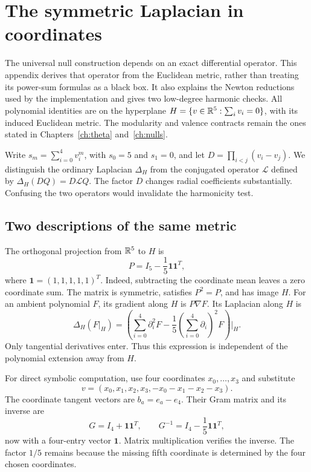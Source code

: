 \chapter{The symmetric Laplacian in coordinates}\label{app:operator}

The universal null construction depends on an exact differential operator. This appendix derives that operator from the Euclidean metric, rather than treating its power-sum formulas as a black box. It also explains the Newton reductions used by the implementation and gives two low-degree harmonic checks. All polynomial identities are on the hyperplane $H=\{v\in\mathbb R^5:\sum_i v_i=0\}$, with its induced Euclidean metric. The modularity and valence contracts remain the ones stated in Chapters~\ref{ch:theta} and~\ref{ch:nulls}.

Write $s_m=\sum_{i=0}^4v_i^m$, with $s_0=5$ and $s_1=0$, and let $D=\prod_{i<j}(v_i-v_j)$. We distinguish the ordinary Laplacian $\Delta_H$ from the conjugated operator $\mathcal L$ defined by $\Delta_H(DQ)=D\mathcal LQ$. The factor $D$ changes radial coefficients substantially. Confusing the two operators would invalidate the harmonicity test.

\section{Two descriptions of the same metric}
The orthogonal projection from $\mathbb R^5$ to $H$ is
\begin{equation}\label{appop:projection}
P=I_5-\frac15\mathbf1\mathbf1^T,
\end{equation}
where $\mathbf1=(1,1,1,1,1)^T$. Indeed, subtracting the coordinate mean leaves a zero coordinate sum. The matrix is symmetric, satisfies $P^2=P$, and has image $H$. For an ambient polynomial $F$, its gradient along $H$ is $P\nabla F$. Its Laplacian along $H$ is
\begin{equation}\label{appop:ambientlap}
\Delta_H(F|_H)
=\left(\sum_{i=0}^4\partial_i^2F
-\frac15\left(\sum_{i=0}^4\partial_i\right)^2F\right)\Big|_H.
\end{equation}
Only tangential derivatives enter. Thus this expression is independent of the polynomial extension away from $H$.

For direct symbolic computation, use four coordinates $x_0,\ldots,x_3$ and substitute
\[
v=(x_0,x_1,x_2,x_3,-x_0-x_1-x_2-x_3).
\]
The coordinate tangent vectors are $b_a=e_a-e_4$. Their Gram matrix and its inverse are
\begin{equation}\label{appop:chartmetric}
G=I_4+\mathbf1\mathbf1^T,
\qquad G^{-1}=I_4-\frac15\mathbf1\mathbf1^T,
\end{equation}
now with a four-entry vector $\mathbf1$. Matrix multiplication verifies the inverse. The factor $1/5$ remains because the missing fifth coordinate is determined by the four chosen coordinates.

